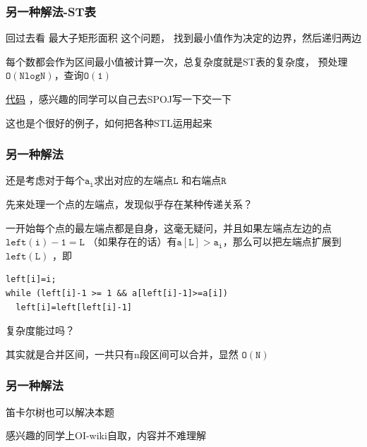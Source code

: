 \documentclass{beamer}
\begin{document}
  \begin{frame}
    \frametitle{另一种解法-ST表}
    回过去看 最大子矩形面积 这个问题，
    找到最小值作为决定的边界，然后递归两边

    \vspace*{1\baselineskip}

    每个数都会作为区间最小值被计算一次，总复杂度就是ST表的复杂度，
    预处理$\mathtt{O(NlogN)}$，查询$\mathtt{O(1)}$

    \vspace*{1\baselineskip}

    \href{http://syh521.cn/file/another-1.cpp}{代码}
    ，感兴趣的同学可以自己去SPOJ写一下交一下

    \vspace*{1\baselineskip}

    这也是个很好的例子，如何把各种STL运用起来


  \end{frame}

  \begin{frame}[fragile]
    \frametitle{另一种解法}
    还是考虑对于每个$\mathtt{a_i}$求出对应的左端点$\mathtt{L}$
    和右端点$\mathtt{R}$

    \pause

    \vspace*{1\baselineskip}
    
    先来处理一个点的左端点，发现似乎存在某种传递关系？
    
    \pause

    \vspace*{1\baselineskip}
    一开始每个点的最左端点都是自身，这毫无疑问，并且如果左端点左边的点$\mathtt{left(i)-1=L}$
    （如果存在的话）有$\mathtt{a[L]>a_i}$，那么可以把左端点扩展到 $\mathtt{left(L)}$ ，即

    \begin{lstlisting}
left[i]=i;
while (left[i]-1 >= 1 && a[left[i]-1]>=a[i])
  left[i]=left[left[i]-1]
    \end{lstlisting}

    \pause

    复杂度能过吗？

    \pause

    其实就是合并区间，一共只有n段区间可以合并，显然 $\mathtt{O(N)}$
  \end{frame}

  \begin{frame}
    \frametitle{另一种解法}
    笛卡尔树也可以解决本题

    感兴趣的同学上OI-wiki自取，内容并不难理解
  \end{frame}
\end{document}
